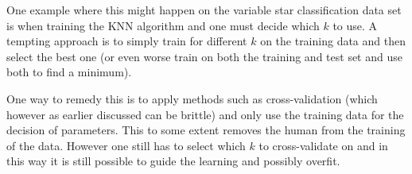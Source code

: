 \documentclass[a4paper, 11pt]{article}
\begin{document}
One example where this might happen on the variable star classification data set is when training the KNN algorithm and one must decide which $k$ to use. A tempting approach is to simply train for different $k$ on the training data and then select the best one (or even worse train on both the training and test set and use both to find a minimum).

One way to remedy this is to apply methods such as cross-validation (which however as earlier discussed can be brittle) and only use the training data for the decision of parameters. This to some extent removes the human from the training of the data. However one still has to select which $k$ to cross-validate on and in this way it is still possible to guide the learning and possibly overfit.


\end{document}
